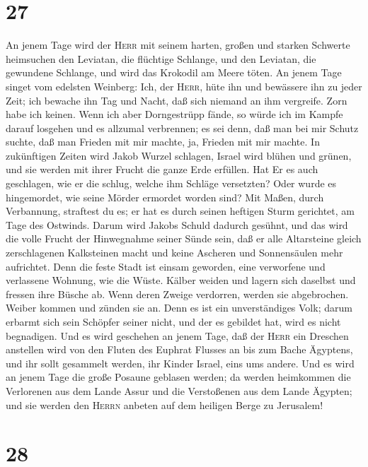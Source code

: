 \hypertarget{section-26}{%
\section{27}\label{section-26}}

 An jenem Tage wird der \textsc{Herr} mit seinem harten,
großen und starken Schwerte heimsuchen den Leviatan, die flüchtige
Schlange, und den Leviatan, die gewundene Schlange, und wird das
Krokodil am Meere töten.  An jenem Tage singet vom
edelsten Weinberg:  Ich, der \textsc{Herr}, hüte ihn und
bewässere ihn zu jeder Zeit; ich bewache ihn Tag und Nacht, daß sich
niemand an ihm vergreife.  Zorn habe ich keinen. Wenn ich
aber Dorngestrüpp fände, so würde ich im Kampfe darauf losgehen und es
allzumal verbrennen;  es sei denn, daß man bei mir Schutz
suchte, daß man Frieden mit mir machte, ja, Frieden mit mir machte.
 In zukünftigen Zeiten wird Jakob Wurzel schlagen, Israel
wird blühen und grünen, und sie werden mit ihrer Frucht die ganze Erde
erfüllen.  Hat Er es auch geschlagen, wie er die schlug,
welche ihm Schläge versetzten? Oder wurde es hingemordet, wie seine
Mörder ermordet worden sind?  Mit Maßen, durch Verbannung,
straftest du es; er hat es durch seinen heftigen Sturm gerichtet, am
Tage des Ostwinds.  Darum wird Jakobs Schuld dadurch
gesühnt, und das wird die volle Frucht der Hinwegnahme seiner Sünde
sein, daß er alle Altarsteine gleich zerschlagenen Kalksteinen macht und
keine Ascheren und Sonnensäulen mehr aufrichtet.  Denn
die feste Stadt ist einsam geworden, eine verworfene und verlassene
Wohnung, wie die Wüste. Kälber weiden und lagern sich daselbst und
fressen ihre Büsche ab.  Wenn deren Zweige verdorren,
werden sie abgebrochen. Weiber kommen und zünden sie an. Denn es ist ein
unverständiges Volk; darum erbarmt sich sein Schöpfer seiner nicht, und
der es gebildet hat, wird es nicht begnadigen.  Und es
wird geschehen an jenem Tage, daß der \textsc{Herr} ein Dreschen
anstellen wird von den Fluten des Euphrat Flusses an bis zum Bache
Ägyptens, und ihr sollt gesammelt werden, ihr Kinder Israel, eins ums
andere.  Und es wird an jenem Tage die große Posaune
geblasen werden; da werden heimkommen die Verlorenen aus dem Lande Assur
und die Verstoßenen aus dem Lande Ägypten; und sie werden den
\textsc{Herrn} anbeten auf dem heiligen Berge zu Jerusalem!

\hypertarget{section-27}{%
\section{28}\label{section-27}}

